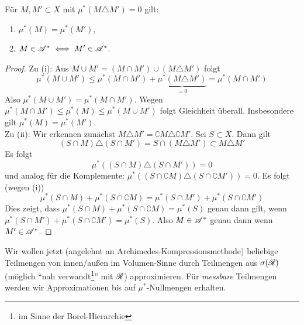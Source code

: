 \begin{lemma} \label{uebereinstimmen}
\begin{mdframed}
Für $M, M' \subset X$ mit $\mu^*(M \triangle M') =0$ gilt:
\begin{enumerate}[label=(\roman*),topsep=3pt, itemsep=0pt]
	\item $\mu^*(M) = \mu^*(M')$,
	\item $M \in \AA^* \iff M' \in \AA^*$.
\end{enumerate}
\end{mdframed}
\begin{proof}
Zu (i): Aus $M \cup M' = (M \cap M') \cup (M \triangle M')$ folgt
$$
\mu^*(M \cup M' ) \leq \mu^*(M \cap M') + \underbrace{\mu^* (M \triangle M')}_{=0}=\mu^*(M\cap M')
$$ 
Also $\mu^*(M\cup M') = \mu^*(M\cap M')$. Wegen $\mu^*(M\cap M') \leq \mu^*(M) \leq \mu^*(M \cup M')$ folgt Gleichheit überall. Insbesondere gilt $\mu^*(M)=\mu^*(M')$.\\
Zu (ii): Wir erkennen zunächst $M \triangle M' = \complement M \triangle \complement M'$. Sei $S \subset X$. Dann gilt
$$
(S\cap M) \triangle (S \cap M') = S\cap (M \triangle M') \subset M \triangle M'
$$
Es folgt
$$\mu^*((S\cap M)\triangle (S \cap M'))=0$$
und analog für die Komplemente: $\mu^*((S\cap \complement M)\triangle (S \cap \complement M'))=0$.
Es folgt (wegen (i))
$$
\mu^*(S\cap M) + \mu^*(S\cap \complement M) =\mu^*(S \cap M') + \mu^*(S \cap \complement M')
$$
Dies zeigt, dass $\mu^*(S\cap M) + \mu^*(S\cap \complement M) = \mu^*(S)$ genau dann gilt, wenn $\mu^*(S \cap M') + \mu^*(S \cap \complement M')=\mu^*(S)$. Also $M \in \AA^*$ genau dann wenn $M'\in \AA^*$.
\end{proof}
\end{lemma}

Wir wollen jetzt (angelehnt an Archimedes-Kompressionsmethode) beliebige Teilmengen von innen/außen im Volumen-Sinne durch Teilmengen aus $\sigma(\RR)$ (möglich ``nah verwandt\footnote{im Sinne der Borel-Hierarchie}'' mit $\RR$) approximieren. Für \emph{messbare} Teilmengen werden wir Approximationen bis auf $\mu^*$-Nullmengen erhalten.

